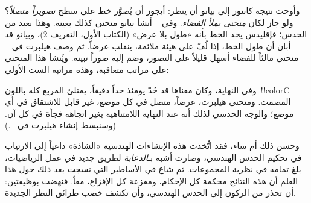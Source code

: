 \documentclass[../../../include/open-logic-section]{subfiles}
\begin{document}
وأوحت نتيجة كانتور إلى بيانو أن ينظر: أيجوز أن يُصوَّر خط على سطح
\emph{تصويراً متصلاً}؟ ولو جاز لكان \emph{منحنى يملأ الفضاء}. وفي
~\citeyear{Peano1890} أنشأ بيانو منحنى كذلك بعينه. وهذا بعيد من الحدس؛
فإقليدس يحد الخط بأنه «طول بلا عرض» (الكتاب الأول، التعريف 2)، وبيانو قد
أبان أن طول الخط، إذا لُفّ على هيئة ملائمة، ينقلب عرضاً. ثم وصف هيلبرت في
~\citeyear{Hilbert1891} منحنى مالئاً للفضاء أسهل قليلاً على التصور، وضم
إليه صوراً تبينه. ويُنشأ هذا المنحنى على مراتب متعاقبة، وهذه مراتبه الست
الأولى:
\begin{center}
\end{center}
وفي النهاية، وكان معناها قد حُدّ يومئذ حداً دقيقاً، يمتلئ المربع كله
باللون~!!{colorC} المصمت. ومنحنى هيلبرت، عرضاً، متصل في كل موضع، غير قابل
للاشتقاق في أي موضع؛ والوجه الحدسي لذلك أنه عند النهاية اللامتناهية يغير
اتجاهه فجأة في كل آن. (وسنبسط إنشاء هيلبرت في
~.)

وحسن ذلك أم ساء، فقد اتُّخذت هذه الإنشاءات الهندسية «الشاذة» داعياً إلى
الارتياب في تحكيم الحدس الهندسي، وصارت أشبه بـ\emph{الدعاية} لطريق جديد
في عمل الرياضيات، بلغ تمامه في نظرية المجموعات. ثم شاع في الأساطير التي
نسجت بعد ذلك حول هذا العلم أن هذه النتائج محكمة كل الإحكام، ومفزعة كل
الإفزاع، معاً. فنهضت بوظيفتين: أن تحذر من الركون إلى الحدس الهندسي، وأن
تكشف خصب طرائق النظر الجديدة.
\end{document}
